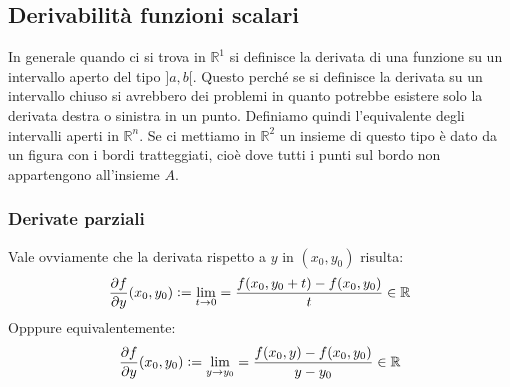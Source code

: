 \subsection{Derivabilità funzioni scalari}
In generale quando ci si trova in $\mathbb{R}^1$ si definisce la derivata di una funzione su un intervallo aperto del tipo $]a, b[$. Questo perché se si definisce la derivata su un intervallo chiuso si avrebbero dei problemi in quanto potrebbe esistere solo la derivata destra o sinistra in un punto. Definiamo quindi l'equivalente degli intervalli aperti in $\mathbb{R}^n$.
Se ci mettiamo in $\mathbb{R}^2$ un insieme di questo tipo è dato da un figura con i bordi tratteggiati, cioè dove tutti i punti sul bordo non appartengono all'insieme $A$. %


\subsubsection{Derivate parziali}
Vale ovviamente che la derivata rispetto a $y$ in $(x_0, y_0)$ risulta:
\begin{equation*}
		\pdv{f}{y}() (x_0, y_0) \vcentcolon = \lim_{t \to 0} = \dfrac{f(x_0, y_0 + t) - f(x_0, y_0)}{t} \in \mathbb{R}
\end{equation*}
Opppure equivalentemente:
\begin{equation*}
	\pdv{f}{y}() (x_0, y_0) \vcentcolon = \lim_{y \to y_0} = \dfrac{f(x_0, y) - f(x_0, y_0)}{y - y_0} \in \mathbb{R}
\end{equation*}

